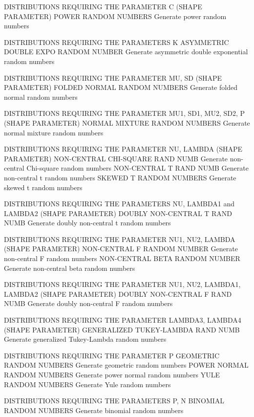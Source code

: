 DISTRIBUTIONS REQUIRING THE PARAMETER C (SHAPE PARAMETER)
   POWER RANDOM NUMBERS           Generate power random numbers

DISTRIBUTIONS REQUIRING THE PARAMETERS K
   ASYMMETRIC DOUBLE EXPO RANDOM NUMBER Generate asymmetric double
                                        exponential random numbers

DISTRIBUTIONS REQUIRING THE PARAMETER MU, SD (SHAPE PARAMETER)
   FOLDED NORMAL RANDOM NUMBERS   Generate folded normal random numbers

DISTRIBUTIONS REQUIRING THE PARAMETER MU1, SD1, MU2, SD2, P (SHAPE PARAMETER)
   NORMAL MIXTURE RANDOM NUMBERS  Generate normal mixture random numbers

DISTRIBUTIONS REQUIRING THE PARAMETER NU, LAMBDA (SHAPE PARAMETER)
   NON-CENTRAL CHI-SQUARE RAND NUMB  Generate non-central Chi-square
                                     random numbers
   NON-CENTRAL T RAND NUMB           Generate non-central t random
                                     numbers
   SKEWED T RANDOM NUMBERS           Generate skewed t random numbers

DISTRIBUTIONS REQUIRING THE PARAMETERS NU, LAMBDA1 and LAMBDA2 (SHAPE PARAMETER)
   DOUBLY NON-CENTRAL T RAND NUMB    Generate doubly non-central t
                                     random numbers

DISTRIBUTIONS REQUIRING THE PARAMETER NU1, NU2, LAMBDA (SHAPE PARAMETER)
   NON-CENTRAL F RANDOM NUMBER      Generate non-central F random
                                    numbers
   NON-CENTRAL BETA RANDOM NUMBER   Generate non-central beta random
                                    numbers

DISTRIBUTIONS REQUIRING THE PARAMETER NU1, NU2, LAMBDA1, LAMBDA2 (SHAPE PARAMETER)
   DOUBLY NON-CENTRAL F RAND NUMB Generate doubly non-central F random
                                  numbers

DISTRIBUTIONS REQUIRING THE PARAMETER LAMBDA3, LAMBDA4 (SHAPE PARAMETER)
   GENERALIZED TUKEY-LAMBDA RAND NUMB  Generate generalized
                                  Tukey-Lambda random numbers

DISTRIBUTIONS REQUIRING THE PARAMETER P
   GEOMETRIC RANDOM NUMBERS       Generate geometric random numbers
   POWER NORMAL RANDOM NUMBERS    Generate power normal random
                                  numbers
   YULE RANDOM NUMBERS            Generate Yule random numbers
 
DISTRIBUTIONS REQUIRING THE PARAMETERS P, N
   BINOMIAL RANDOM NUMBERS        Generate binomial random numbers
 
